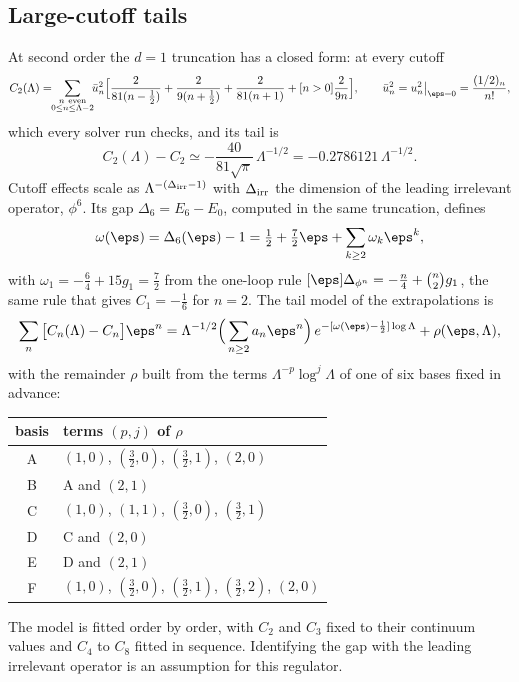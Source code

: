 \subsection{Large-cutoff tails}\label{sec:tails}
At second order the $d=1$ truncation has a closed form: at every cutoff
\begin{equation}
 C_2(\Lambda)=\!\!\sum_{\substack{n\ {\rm even}\\0\le n\le\Lambda-2}}\!\!\bar u_n^2\Big[\frac{2}{81(n-\frac12)}+\frac{2}{9(n+\frac12)}
 +\frac{2}{81(n+1)}+[n>0]\frac{2}{9n}\Big],\qquad \bar u_n^2=u_n^2\big|_{\eps=0}=\frac{(1/2)_n}{n!},
 \label{eq:C2shell}
\end{equation}
which every solver run checks, and its tail is
\begin{equation}
 C_2(\Lambda)-C_2\simeq-\frac{40}{81\sqrt\pi}\,\Lambda^{-1/2}=-0.2786121\,\Lambda^{-1/2} .
 \label{eq:T2}
\end{equation}
Cutoff effects scale as $\Lambda^{-(\Delta_{\rm irr}-1)}$ with $\Delta_{\rm irr}$ the dimension of the leading
irrelevant operator, $\phi^6$. Its gap $\Delta_6=E_6-E_0$, computed in the same truncation, defines
\begin{equation}
 \omega(\eps)=\Delta_6(\eps)-1=\tfrac12+\tfrac72\eps+\sum_{k\ge2}\omega_k\eps^k,
 \label{eq:omega}
\end{equation}
with $\omega_1=-\tfrac64+15g_1=\tfrac72$ from the one-loop rule $[\eps]\Delta_{\phi^n}=-\tfrac n4+\binom n2g_1$, the same
rule that gives $C_1=-\tfrac16$ for $n=2$. The tail model of the extrapolations is
\begin{equation}
 \sum_n\big[C_n(\Lambda)-C_n\big]\eps^n=\Lambda^{-1/2}\Big(\sum_{n\ge2}a_n\eps^n\Big)\,e^{-[\omega(\eps)-\frac12]\log\Lambda}
 +\rho(\eps,\Lambda),
 \label{eq:tail}
\end{equation}
with the remainder $\rho$ built from the terms $\Lambda^{-p}\log^j\Lambda$ of one of six bases fixed in advance:
\begin{center}\footnotesize
\begin{tabular}{@{}cl@{}}
\toprule
basis & terms $(p,j)$ of $\rho$ \\
\midrule
A & $(1,0)$, $(\tfrac32,0)$, $(\tfrac32,1)$, $(2,0)$ \\
B & A and $(2,1)$ \\
C & $(1,0)$, $(1,1)$, $(\tfrac32,0)$, $(\tfrac32,1)$ \\
D & C and $(2,0)$ \\
E & D and $(2,1)$ \\
F & $(1,0)$, $(\tfrac32,0)$, $(\tfrac32,1)$, $(\tfrac32,2)$, $(2,0)$ \\
\bottomrule
\end{tabular}
\end{center}
The model is fitted order by order, with $C_2$ and $C_3$ fixed to their continuum values and $C_4$ to $C_8$ fitted in
sequence. Identifying the gap with the leading irrelevant operator is an assumption for this regulator.


